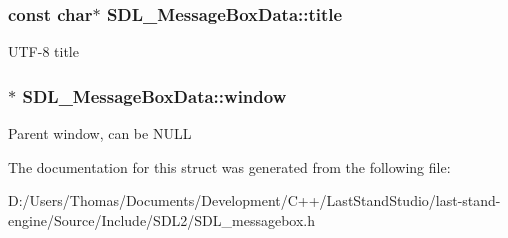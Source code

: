 \subsubsection[{title}]{\setlength{\rightskip}{0pt plus 5cm}const char$\ast$ S\+D\+L\+\_\+\+Message\+Box\+Data\+::title}\label{structSDL__MessageBoxData_a93ceeafeed20b553ad4c86c9be37f117}
U\+T\+F-\/8 title \hypertarget{structSDL__MessageBoxData_a5c333bc93705c66068e140bc28daedcb}{}
\subsubsection[{window}]{$\ast$ S\+D\+L\+\_\+\+Message\+Box\+Data\+::window}\label{structSDL__MessageBoxData_a5c333bc93705c66068e140bc28daedcb}
Parent window, can be N\+U\+L\+L 

The documentation for this struct was generated from the following file\+:\begin{DoxyCompactItemize}
\item 
D\+:/\+Users/\+Thomas/\+Documents/\+Development/\+C++/\+Last\+Stand\+Studio/last-\/stand-\/engine/\+Source/\+Include/\+S\+D\+L2/S\+D\+L\+\_\+messagebox.\+h\end{DoxyCompactItemize}
